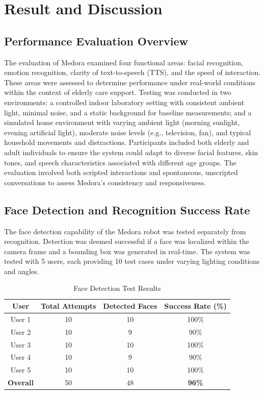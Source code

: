 \chapter{Result and Discussion }



\section{Performance Evaluation Overview}

The evaluation of Medora examined four functional areas: facial recognition, emotion recognition, clarity of text-to-speech (TTS), and the speed of interaction. These areas were assessed to determine performance under real-world conditions within the context of elderly care support. Testing was conducted in two environments: a controlled indoor laboratory setting with consistent ambient light, minimal noise, and a static background for baseline measurements; and a simulated home environment with varying ambient light (morning sunlight, evening artificial light), moderate noise levels (e.g., television, fan), and typical household movements and distractions. Participants included both elderly and adult individuals to ensure the system could adapt to diverse facial features, skin tones, and speech characteristics associated with different age groups. The evaluation involved both scripted interactions and spontaneous, unscripted conversations to assess Medora’s consistency and responsiveness.



\section{Face Detection and Recognition Success Rate}
The face detection capability of the Medora robot was tested separately from recognition. Detection was deemed successful if a face was localized within the camera frame and a bounding box was generated in real-time. The system was tested with 5 users, each providing 10 test cases under varying lighting conditions and angles.

\begin{table}[h!]
\centering
\caption{Face Detection Test Results}
\begin{tabular}{|c|c|c|c|}
\hline
\textbf{User} & \textbf{Total Attempts} & \textbf{Detected Faces} & \textbf{Success Rate (\%)} \\
\hline
User 1 & 10 & 10 & 100\% \\
User 2 & 10 & 9 & 90\% \\
User 3 & 10 & 10 & 100\% \\
User 4 & 10 & 9 & 90\% \\
User 5 & 10 & 10 & 100\% \\
\hline
\textbf{Overall} & 50 & 48 & \textbf{96\%} \\
\hline
\end{tabular}
\end{table}

